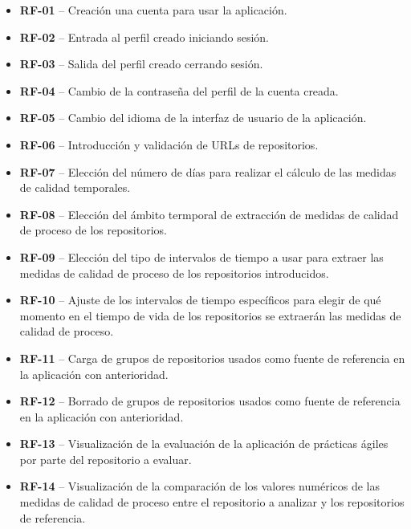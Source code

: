 \begin{itemize}
    \item \textbf{RF-01} – Creación una cuenta para usar la aplicación.
    
    \item \textbf{RF-02} – Entrada al perfil creado iniciando sesión.
    
    \item \textbf{RF-03} – Salida  del perfil creado cerrando sesión.
    
    \item \textbf{RF-04} – Cambio de la contraseña del perfil de la cuenta creada.
    
    \item \textbf{RF-05} – Cambio del idioma de la interfaz de usuario de la aplicación.
    
    \item \textbf{RF-06} – Introducción y validación de URLs de repositorios.
    
    \item \textbf{RF-07} – Elección del número de días para realizar el cálculo de las medidas de calidad temporales.
    
    \item \textbf{RF-08} – Elección del ámbito termporal de extracción de medidas de calidad de proceso de los repositorios.
    
    \item \textbf{RF-09} – Elección del tipo de intervalos de tiempo a usar para extraer las medidas de calidad de proceso de los repositorios introducidos.
    
    \item \textbf{RF-10} – Ajuste de los intervalos de tiempo específicos para elegir de qué momento en el tiempo de vida de los repositorios se extraerán las medidas de calidad de proceso.
    
    \item \textbf{RF-11} – Carga de grupos de repositorios usados como fuente de referencia en la aplicación con anterioridad.
    
    \item \textbf{RF-12} – Borrado de grupos de repositorios usados como fuente de referencia en la aplicación con anterioridad.
    
    \item \textbf{RF-13} – Visualización de la evaluación de la aplicación de prácticas ágiles por parte del repositorio a evaluar.
    
    \item \textbf{RF-14} – Visualización de la comparación de los valores numéricos de las medidas de calidad de proceso entre el repositorio a analizar y los repositorios de referencia.
\end{itemize}


